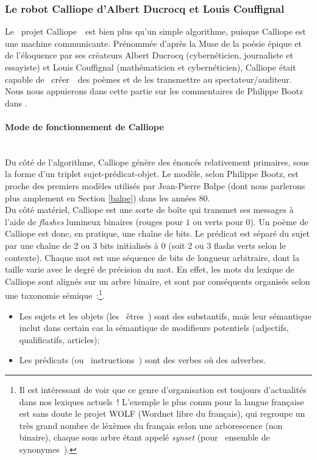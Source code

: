\documentclass{article}
\newcommand{\subsubsubsection}[1]{\paragraph{#1}\mbox{}\\}
\begin{document}
			\subsubsection{Le robot Calliope d'Albert Ducrocq et Louis Couffignal}\label{calliope}
				Le \guillemotleft~projet Calliope~\guillemotright~est bien plus qu'un simple algorithme, puisque Calliope est une machine communicante. Prénommée d'après la Muse de la poésie épique et de l'éloquence par ses créateurs Albert Ducrocq (cybernéticien, journaliste et essayiste) et Louis Couffignal (mathématicien et cybernéticien), Calliope était capable de \guillemotleft~créer~\guillemotright~des poèmes et de les transmettre au spectateur/auditeur. Nous nous appuierons dans cette partie sur les commentaires de Philippe Bootz dans \autocite{bootz}.\\
				\subsubsubsection{Mode de fonctionnement de Calliope}
					Du côté de l'algorithme, Calliope génère des énoncés relativement primaires, sous la forme d'un triplet sujet-prédicat-objet. Le modèle, selon Philippe Bootz, est proche des premiers modèles utilisés par Jean-Pierre Balpe (dont nous parlerons plus amplement en Section \ref{balpe}) dans les années 80.\\
					Du côté matériel, Calliope est une sorte de boîte qui transmet ses messages à l'aide de \textit{flashes} lumineux binaires (rouges pour $1$ ou verts pour $0$). Un poème de Calliope est donc, en pratique, une chaîne de bits. Le prédicat est séparé du sujet par une chaîne de 2 ou 3 bits initialisés à 0 (soit 2 ou 3 flashs verts selon le contexte). Chaque mot est une séquence de bits de longueur arbitraire, dont la taille varie avec le degré de précision du mot. En effet, les mots du lexique de Calliope sont alignés sur un arbre binaire, et sont par conséquents organisés selon une taxonomie sémique~:\footnote{Il est intéressant de voir que ce genre d'organisation est toujours d'actualités dans nos lexiques actuels ! L'exemple le plus connu pour la langue française est sans doute le projet WOLF (Wordnet libre du français), qui regroupe un très grand nombre de léxèmes du français selon une arborescence (non binaire), chaque sous arbre étant appelé \textit{synset} (pour \guillemotleft~ensemble de synonymes~\guillemotright).}.
					\vspace{2mm}
					\begin{itemize}
						\item Les sujets et les objets (les \guillemotleft~êtres~\guillemotright) sont des substantifs, mais leur sémantique inclut dans certain cas la sémantique de modifieurs potentiels (adjectifs, qualificatifs, articles);
						\item Les prédicats (ou \guillemotleft~instructions~\guillemotright) sont des verbes où des adverbes.
					\end{itemize} 
\end{document}

